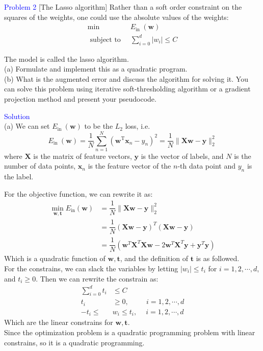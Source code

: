 \textcolor{blue}{Problem 2}
[The Lasso algorithm] Rather than a soft order constraint on the squares of the weights, one could use the absolute values of the weights:
\begin{align*}
\min &\ E_{\text {in }}(\mathbf{w}) \\
\text { subject to } &\ \sum_{i=0}^d\left|w_i\right| \leq C
\end{align*}

The model is called the lasso algorithm.\\
(a) Formulate and implement this as a quadratic program.\\
(b) What is the augmented error and discuss the algorithm for solving it. You can solve this problem using iterative soft-thresholding algorithm or a gradient projection method and present your pseudocode.

\textcolor{blue}{Solution}\\
(a) We can set $E_{\text {in }}(\mathbf{w})$ to be the $L_2$ loss, i.e.
$$E_{\text {in }}(\mathbf{w})=\frac{1}{N} \sum_{n=1}^{N}\left(\mathbf{w}^{\mathrm{T}} \mathbf{x}_{n}-y_{n}\right)^{2}=\dfrac{1}{N}\|\mathbf{Xw}-\mathbf{y}\|_2^2$$
where $\mathbf{X}$ is the matrix of feature vectors, $\mathbf{y}$ is the vector of labels, and $N$ is the number of data points, $\mathbf{x}_{n}$ is the feature vector of the $n$-th data point and $y_{n}$ is the label.

For the objective function, we can rewrite it as:
\begin{align*}
\min_{\mathbf{w},\mathbf{t}} E_{\text{in}}(\mathbf{w}) &= \dfrac{1}{N}\|\mathbf{Xw}-\mathbf{y}\|_2^2 \\
&= \dfrac{1}{N}(\mathbf{Xw}-\mathbf{y})^T(\mathbf{Xw}-\mathbf{y}) \\
&= \dfrac{1}{N}(\mathbf{w}^T\mathbf{X}^T\mathbf{Xw}-2\mathbf{w}^T\mathbf{X}^T\mathbf{y}+\mathbf{y}^T\mathbf{y})
\end{align*}
Which is a quadratic function of $\mathbf{w},\mathbf{t}$, and the definition of $\mathbf{t}$ is as followed.\\
For the constrains, we can slack the variables by letting $|w_i| \leq t_i$ for $i=1,2,\cdots,d$, and $t_i \geq 0$. Then we can rewrite the constrain as:
\begin{align*}
\sum_{i=0}^d t_i &\leq C \\
t_i &\geq 0, \quad\quad\ \ i=1,2,\cdots,d \\
-t_i \leq &w_i \leq t_i, \quad\ i=1,2,\cdots,d 
\end{align*}
Which are the linear constrains for $\mathbf{w}, \mathbf{t}$.\\
Since the optimization problem is a quadratic programming problem with linear constrains, so it is a quadratic programming.\\


